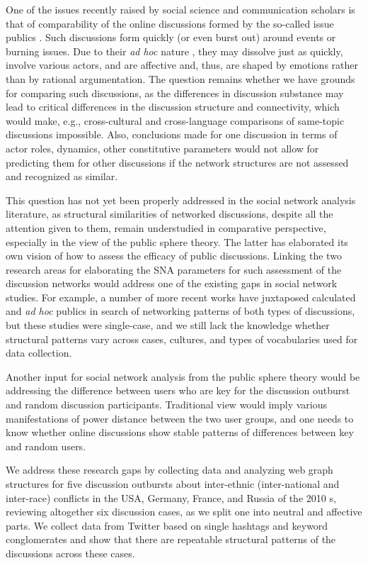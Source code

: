 One of the issues recently raised by social science and communication scholars is that of comparability of the online discussions formed by the so-called issue publics \cite{Dahlgren}\cite[p.~422]{Habermas}. Such discussions form quickly (or even burst out) around events or burning issues. Due to their \textit{ad hoc} nature \cite{BrunsBurgess}, they may dissolve just as quickly, involve various actors, and are affective \cite{Papacharissi} and, thus, are shaped by emotions rather than by rational argumentation. The question remains whether we have grounds for comparing such discussions, as the differences in discussion substance may lead to critical differences in the discussion structure and connectivity, which would make, e.g., cross-cultural and cross-language comparisons of same-topic discussions impossible. Also, conclusions made for one discussion in terms of actor roles, dynamics, other constitutive parameters would not allow for predicting them for other discussions if the network structures are not assessed and recognized as similar.

This question has not yet been properly addressed in the social network analysis literature, as structural similarities of networked discussions, despite all the attention given to them, remain understudied in comparative perspective, especially in the view of the public sphere theory. The latter has elaborated its own vision of how to assess the efficacy of public discussions. Linking the two research areas for elaborating the SNA parameters for such assessment of the discussion networks would address one of the existing gaps in social network studies. For example, a number of more recent works have juxtaposed calculated and \textit{ad hoc} publics \cite{BrunsBurgess2015,LynnRosatiNair} in search of networking patterns of both types of discussions, but these studies were single-case, and we still lack the knowledge whether structural patterns vary across cases, cultures, and types of vocabularies used for data collection.

Another input for social network analysis from the public sphere theory would be addressing the difference between users who are key for the discussion outburst and random discussion participants. Traditional view would imply various manifestations of power distance between the two user groups, and one needs to know whether online discussions show stable patterns of differences between key and random users.

We address these research gaps by collecting data and analyzing web graph structures for five discussion outbursts about inter-ethnic (inter-national and inter-race) conflicts in the USA, Germany, France, and Russia of the 2010 s, reviewing altogether six discussion cases, as we split one into neutral and affective parts. We collect data from Twitter based on single hashtags and keyword conglomerates and show that there are repeatable structural patterns of the discussions across these cases.

